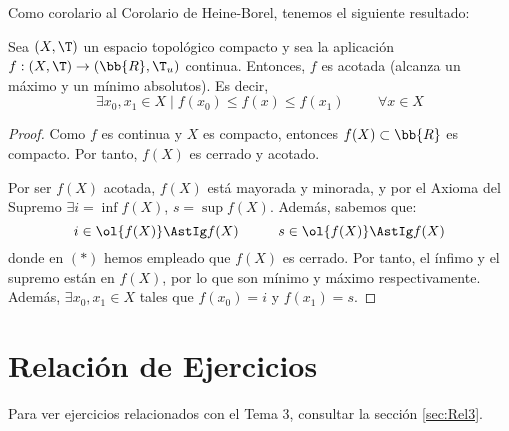 Como corolario al Corolario de Heine-Borel, tenemos el siguiente resultado:
\begin{coro}
    Sea $(X,\T)$ un espacio topológico compacto y sea la aplicación $f:(X,\T)\to (\bb{R},\T_u)$ continua.    
    Entonces, $f$ es acotada (alcanza un máximo y un mínimo absolutos). Es decir,
    \begin{equation*}
        \exists x_0,x_1\in X \mid f(x_0) \leq f(x) \leq f(x_1) \hspace{1cm} \forall x\in X
    \end{equation*}
\end{coro}
\begin{proof}
    Como $f$ es continua y $X$ es compacto, entonces $f(X)\subset \bb{R}$ es compacto. Por tanto, $f(X)$ es cerrado y acotado.

    Por ser $f(X)$ acotada, $f(X)$ está mayorada y minorada, y por el Axioma del Supremo $\exists i=\inf f(X)$, $s=\sup f(X)$. Además, sabemos que:
    \begin{equation*}
        i\in \ol{f(X)}\AstIg f(X) \hspace{1cm}
        s\in \ol{f(X)}\AstIg f(X)
    \end{equation*}
    donde en $(\ast)$ hemos empleado que $f(X)$ es cerrado. Por tanto, el ínfimo y el supremo están en $f(X)$, por lo que son mínimo y máximo respectivamente.
    Además, $\exists x_0,x_1\in X$ tales que $f(x_0)=i$ y $f(x_1)=s$.

\end{proof}


\section{Relación de Ejercicios}
Para ver ejercicios relacionados con el Tema 3, consultar la sección \ref{sec:Rel3}.